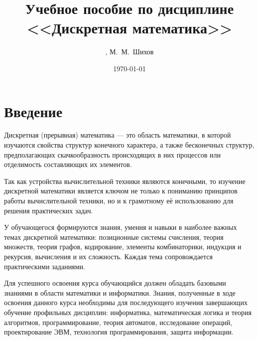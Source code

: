 \documentclass[a4paper,oneside,14pt]{scrbook}
\title{Учебное пособие по дисциплине\\<<Дискретная математика>>}
\author{\fbox{Т.~Р.~Фадеева}, М.~М.~Шихов}
\date{\today}
\begin{document}
    \maketitle
    \tableofcontents

    \chapter*{Введение}
    
    Дискретная (прерывная) математика --- это область математики, в которой изучаются свойства структур конечного характера, а также бесконечных структур, предполагающих скачкообразность происходящих в них процессов или отделимость составляющих их элементов. 
    
    Так как устройства вычислительной техники являются конечными, то изучение дискретной математики является ключом не только к пониманию принципов работы вычислительной техники, но и к грамотному её использованию для решения практических задач.

    У обучающегося формируются знания, умения и навыки в наиболее важных темах дискретной математики: позиционные системы счисления, теория множеств, теория графов, кодирование, элементы комбинаторики, индукция и рекурсия, вычисления и их сложность. Каждая тема сопровождается практическими заданиями. 
    
    Для успешного освоения курса обучающийся должен обладать базовыми знаниями в области математики и информатики. Знания, полученные в ходе освоения данного курса необходимы для последующего изучения завершающих обучение профильных дисциплин: информатика, математическая логика и теория алгоритмов, программирование, теория автоматов, исследование операций, проектирование ЭВМ, технология программирования, защита информации.
    
    

\end{document}
